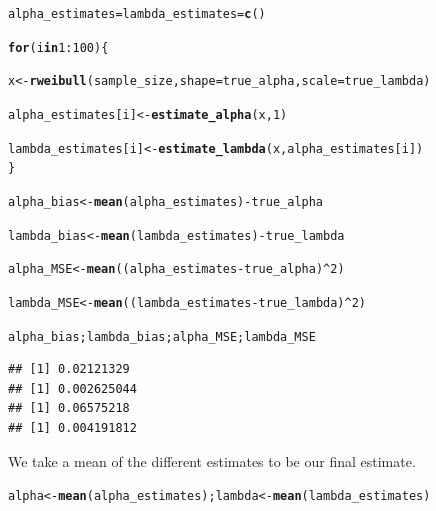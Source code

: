 \documentclass[11pt, a4paper]{article}\usepackage[]{graphicx}\usepackage[]{xcolor}
\makeatletter
\newcommand{\hlnum}[1]{\textcolor[rgb]{0.686,0.059,0.569}{#1}}%
\newcommand{\hlopt}[1]{\textcolor[rgb]{0,0,0}{#1}}%
\newcommand{\hldef}[1]{\textcolor[rgb]{0.345,0.345,0.345}{#1}}%
\newcommand{\hlkwa}[1]{\textcolor[rgb]{0.161,0.373,0.58}{\textbf{#1}}}%
\newcommand{\hlkwb}[1]{\textcolor[rgb]{0.69,0.353,0.396}{#1}}%
\newcommand{\hlkwc}[1]{\textcolor[rgb]{0.333,0.667,0.333}{#1}}%
\newcommand{\hlkwd}[1]{\textcolor[rgb]{0.737,0.353,0.396}{\textbf{#1}}}%
\newenvironment{kframe}{%
 \def\at@end@of@kframe{}%
 \ifinner\ifhmode%
  \def\at@end@of@kframe{\end{minipage}}%
  \begin{minipage}{\columnwidth}%
 \fi\fi%
 \def\FrameCommand##1{\hskip\@totalleftmargin \hskip-\fboxsep
 \colorbox{shadecolor}{##1}\hskip-\fboxsep
     \hskip-\linewidth \hskip-\@totalleftmargin \hskip\columnwidth}%
 \MakeFramed {\advance\hsize-\width
   \@totalleftmargin\z@ \linewidth\hsize
   \@setminipage}}%
 {\par\unskip\endMakeFramed%
 \at@end@of@kframe}
\newenvironment{knitrout}{}{} %
\makeatother
\begin{document}
\begin{knitrout}
\color{fgcolor}\begin{kframe}
\begin{alltt}
\hldef{alpha_estimates} \hlkwb{=} \hldef{lambda_estimates} \hlkwb{=} \hlkwd{c}\hldef{()}

\hlkwa{for} \hldef{(i} \hlkwa{in} \hlnum{1}\hlopt{:}\hlnum{100}\hldef{)\{}

  \hldef{x} \hlkwb{<-} \hlkwd{rweibull}\hldef{(sample_size,} \hlkwc{shape} \hldef{= true_alpha,} \hlkwc{scale} \hldef{= true_lambda)}

  \hldef{alpha_estimates[i]} \hlkwb{<-} \hlkwd{estimate_alpha}\hldef{(x,} \hlnum{1}\hldef{)}

  \hldef{lambda_estimates[i]} \hlkwb{<-} \hlkwd{estimate_lambda}\hldef{(x, alpha_estimates[i])}
\hldef{\}}

\hldef{alpha_bias} \hlkwb{<-} \hlkwd{mean}\hldef{(alpha_estimates)} \hlopt{-} \hldef{true_alpha}

\hldef{lambda_bias} \hlkwb{<-} \hlkwd{mean}\hldef{(lambda_estimates)} \hlopt{-} \hldef{true_lambda}

\hldef{alpha_MSE} \hlkwb{<-} \hlkwd{mean}\hldef{( (alpha_estimates} \hlopt{-} \hldef{true_alpha)}\hlopt{^}\hlnum{2} \hldef{)}

\hldef{lambda_MSE} \hlkwb{<-} \hlkwd{mean}\hldef{( (lambda_estimates} \hlopt{-} \hldef{true_lambda)}\hlopt{^}\hlnum{2} \hldef{)}
\end{alltt}
\end{kframe}
\end{knitrout}

\begin{knitrout}
\color{fgcolor}\begin{kframe}
\begin{alltt}
\hldef{alpha_bias; lambda_bias; alpha_MSE; lambda_MSE}
\end{alltt}
\begin{verbatim}
## [1] 0.02121329
## [1] 0.002625044
## [1] 0.06575218
## [1] 0.004191812
\end{verbatim}
\end{kframe}
\end{knitrout}

We take a mean of the different estimates to be our final estimate.

\begin{knitrout}
\color{fgcolor}\begin{kframe}
\begin{alltt}
\hldef{alpha} \hlkwb{<-} \hlkwd{mean}\hldef{(alpha_estimates); lambda} \hlkwb{<-} \hlkwd{mean}\hldef{(lambda_estimates)}
\end{alltt}
\end{kframe}
\end{knitrout}
\end{document}
